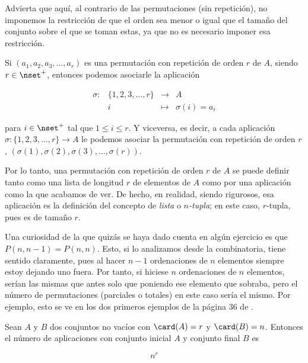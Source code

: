 Advierta que aquí, al contrario de las permutaciones (sin repetición), no
imponemos la restricción de que el orden sea menor o igual que el tamaño del
conjunto sobre el que se toman estas, ya que no es necesario imponer esa
restricción.

Si $(a_1, a_2, a_3, \ldots, a_r)$ es una permutación con repetición de orden
$r$ de $A$, siendo $r \in \nset^{+}$, entonces podemos asociarle la
aplicación

\begin{equation*}
  \begin{array}{lrcl}
    \sigma:   & \{1, 2, 3, \ldots, r\}  & \longrightarrow & A     \\
              & i                       & \longmapsto     & \sigma(i) = a_i
  \end{array}
\end{equation*}

\noindent para $i \in \nset^{+}$ tal que $1 \leq i \leq r$. Y viceversa, es
decir, a cada aplicación $\sigma: \{1, 2, 3, \ldots, r\} \longrightarrow A$
le podemos asociar la permutación con repetición de orden $r$, $(\sigma(1),
\sigma(2), \sigma(3), \ldots, \sigma(r))$.

Por lo tanto, una permutación con repetición de orden $r$ de $A$ se puede
definir tanto como una lista de longitud $r$ de elementos de $A$ como por
una aplicación como la que acabamos de ver. De hecho, en realidad, siendo
rigurosos, esa aplicación es la definición del concepto de \emph{lista} o
$n$\emph{-tupla}; en este caso, $r$-tupla, pues es de tamaño $r$.

Una curiosidad de la que quizás se haya dado cuenta en algún ejercicio es
que $P(n, n-1) = P(n, n)$. Esto, si lo analizamos desde la combinatoria,
tiene sentido claramente, pues al hacer $n-1$ ordenaciones de $n$ elementos
siempre estoy dejando uno fuera. Por tanto, si hiciese $n$ ordenaciones de
$n$ elementos, serían las mismas que antes solo que poniendo ese elemento
que sobraba, pero el número de permutaciones (parciales o totales) en este
caso sería el mismo. Por ejemplo, esto se ve en los dos primeros ejemplos de
la página 36 de \cite{brualdi}.

\begin{deffinition}
  Sean $A$ y $B$ dos conjuntos no vacíos con $\card(A) = r$ y $\card(B) =
  n$. Entonces el número de aplicaciones con conjunto inicial $A$ y conjunto
  final $B$ es

  $$ n^r $$
\end{deffinition}

